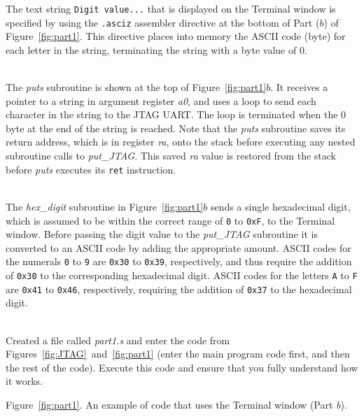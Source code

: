 \documentclass[epsfig,10pt,fullpage]{article}
\begin{document}
The text string \texttt{Digit value...} that is displayed on the Terminal window is specified by 
using the \texttt{.asciz} assembler directive at the bottom of Part ($b$) of 
Figure~\ref{fig:part1}. This directive places into memory the ASCII code (byte) for each 
letter in the string, terminating the string with a byte value of 0.

~\\
The {\it puts} subroutine is shown at the top of Figure~\ref{fig:part1}$b$. It receives 
a pointer to a string in argument register {\it a0}, and uses a loop to send each character 
in the string to the JTAG UART. The loop is terminated when the 0 byte at the end of the
string is reached. Note that the {\it puts} subroutine saves its return address, which is in
register {\it ra}, onto the stack before executing any nested subroutine calls to 
{\it put\_JTAG}. This saved {\it ra} value is restored from the stack before {\it puts}
executes its \texttt{ret} instruction.

~\\
The {\it hex\_digit} subroutine in Figure~\ref{fig:part1}$b$ sends a single hexadecimal
digit, which is assumed to be within the correct range of \texttt{0} to \texttt{0xF}, to
the Terminal window. Before passing the digit value to the {\it put\_JTAG} subroutine it
is converted to an ASCII code by adding the appropriate amount. ASCII codes for the numerals
\texttt{0} to \texttt{9} are \texttt{0x30} to \texttt{0x39}, respectively, and thus require 
the addition of \texttt{0x30} to the corresponding hexadecimal digit.  ASCII codes for 
the letters \texttt{A} to \texttt{F} are \texttt{0x41} to \texttt{0x46}, respectively, 
requiring the addition of \texttt{0x37} to the hexadecimal digit. 

~\\
Created a file called {\it part1.s} and enter the code from
Figures~\ref{fig:JTAG}~and~\ref{fig:part1} (enter the main program code first, and then
the rest of the code). Execute this code and ensure that you fully understand how it works.

\begin{center} \begin{minipage}[h]{15 cm}

\end{minipage} \end{center}
\begin{center}
Figure~\ref{fig:part1}. An example of code that uses the Terminal window (Part {\it b}).
\end{center}
\end{document}
